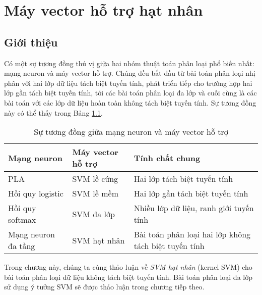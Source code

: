 \chapter{Máy vector hỗ trợ hạt nhân}
\label{cha:kernelsvm}
\section{Giới thiệu}
 
Có một sự tương đồng thú vị giữa hai nhóm thuật toán phân loại phổ biến nhất: mạng neuron và máy vector hỗ trợ. Chúng đều bắt đầu từ bài toán phân loại nhị phân 
với hai lớp dữ liệu tách biệt tuyến tính, phát triển tiếp cho trường hợp hai lớp gần tách biệt tuyến tính, tới các bài toán phân loại đa lớp và cuối cùng là các
bài toán với các lớp dữ liệu hoàn toàn không tách biệt tuyến tính. Sự tương đồng này 
có thể thấy trong Bảng \ref{tab:21_1}.
 
 
\begin{table}[h!]
\centering
\caption{Sự tương đồng giữa mạng neuron và máy vector hỗ trợ}
\label{tab:21_1}
\def\arraystretch{1.5}
\setlength\tabcolsep{5pt}
\begin{tabular}{|l|l|l|}
\hline
\textbf{Mạng neuron} & \textbf{Máy vector hỗ trợ}& \textbf{Tính chất chung} \\ \hline
PLA                 &  SVM lề cứng        & Hai lớp tách biệt tuyến tính             \\ \hline  
Hồi quy logistic & SVM lề mềm    & Hai lớp gần tách biệt tuyến tính        \\ \hline 
Hồi quy softmax     & SVM đa lớp   & Nhiều lớp dữ liệu, ranh giới tuyến tính              \\ \hline 
Mạng neuron đa tầng & SVM hạt nhân         & Bài toán phân loại hai lớp không tách biệt tuyến tính \\ \hline
\end{tabular}
\end{table}
 
Trong chương này, chúng ta cùng thảo luận về \textit{SVM hạt nhân} (kernel SVM) cho bài toán phân loại dữ liệu không tách biệt tuyến tính. Bài toán phân loại đa lớp sử dụng ý tưởng SVM sẽ được thảo luận trong chương tiếp theo.

